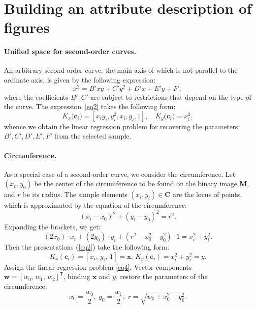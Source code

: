 \documentclass[12pt, twoside]{article}
\numberwithin{equation}{section}
\begin{document}
\section{Building an attribute description of figures }
\paragraph{ Unified space for second-order curves.} An arbitrary second-order curve, the main axis of which is not parallel to the ordinate axis, is given by the following expression:
\[
\label{st:coef}
x^2 = B'xy+C'y^2+D'x+E'y+F',
\]
where the coefficients $B ', C'$ are subject to restrictions that depend on the type of the curve. The expression~\eqref{eq2} takes the following form:
\[
\label{st:K_map}
K_x\bigr(\mathbf{c}_i\bigr)=\left[x_iy_i, y_i^2, x_i, y_i, 1\right], \quad K_y\bigr(\mathbf{c}_i\bigr)=x_i^2,
\]
whence we obtain the linear regression problem for recovering the parameters~$ B ', C', D ', E', F '$ from the selected sample.

\paragraph{ Circumference.} As a special case of a second-order curve, we consider the circumference.
Let $(x_0, y_0)$ be the center of the circumference to be found on the binary image $\mathbf {M} $, and $r$ be its radius.
The sample elements $(x_i, y_i) \in \mathbf {C}$ are the locus of points, which is approximated by the equation of the circumference:
\begin{equation}
(x_i - x_0)^2 + (y_i - y_0)^2 = r^2.
\end{equation}
Expanding the brackets, we get:
\begin{equation}(2x_0)\cdot x_i + (2y_0)\cdot y_i + (r^2 - x_0^2 - y_0^2)\cdot 1 = x_i^2 + y_i^2 . 
\end{equation}
Then the presentations (\ref{eq2}) take the following form:
\begin{equation}
\label{10}
K_{x}(\mathbf{c}_i) = [x_i, \, y_i, \, 1] = \mathbf{x}, \,  K_{y}(\mathbf{c}_i) = x_i^2+y_i^2 = y.
\end{equation} 
Assign the linear regression problem \eqref{eq4}.
Vector components $\mathbf{w} = [w_0, \, w_1, \, w_2]^\mathsf{T}$, binding $\mathbf{x}$ and $y$, restore the parameters of the circumference: \begin{equation} x_0 = \frac{w_0}{2}, \; y_0 = \frac{w_1}{2}, \; r = \sqrt{w_3 + x_0^2 + y_0 ^2}.\end{equation}
\end{document}
